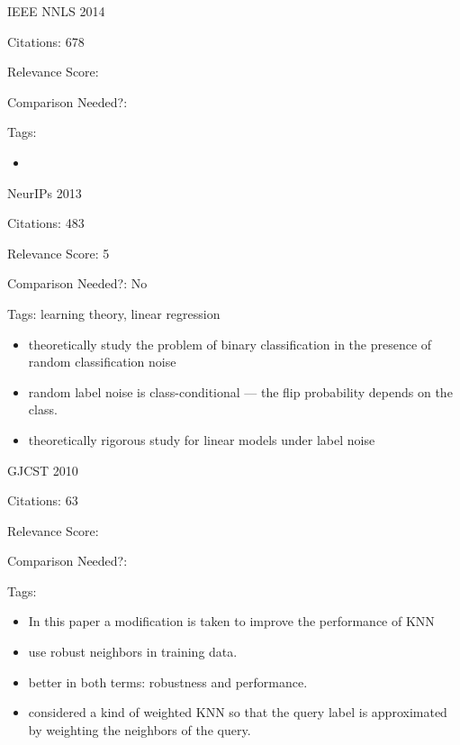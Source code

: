 \documentclass[11pt]{article}
\begin{document}
\vspace{2cm}

\noindent IEEE NNLS 2014

\noindent Citations: 678

\noindent Relevance Score:

\noindent Comparison Needed?: 

\noindent Tags:

\begin{itemize}
\item 
\end{itemize}

\vspace{2cm}

\noindent NeurIPs 2013

\noindent Citations: 483

\noindent Relevance Score: 5

\noindent Comparison Needed?: No

\noindent Tags: learning theory, linear regression

\begin{itemize}
\item theoretically study the problem of binary classification in the presence of random classification noise
\item random label noise is class-conditional — the flip probability depends on the class.
\item theoretically rigorous study for linear models under label noise
\end{itemize}

\vspace{2cm}

\noindent GJCST 2010

\noindent Citations: 63

\noindent Relevance Score:

\noindent Comparison Needed?: 

\noindent Tags:

\begin{itemize}
\item In this paper a modification is taken to improve the performance of KNN
\item use robust neighbors in training data.
\item better in both terms: robustness and performance.
\item considered a kind of weighted KNN so that the query label is approximated by weighting the neighbors of the query.
\end{itemize}
\end{document}

